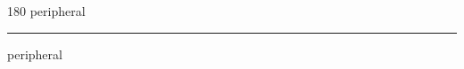 
\begin{frame}
\begin{center}
\begin{turn}{180}
{\fontsize{2.5cm}{1em}\selectfont peripheral}
\end{turn}
\vspace{1em}\par  
\hrule
\vspace{1em}\par  
{\fontsize{2.5cm}{1em}\selectfont peripheral}
\end{center}
\end{frame}
